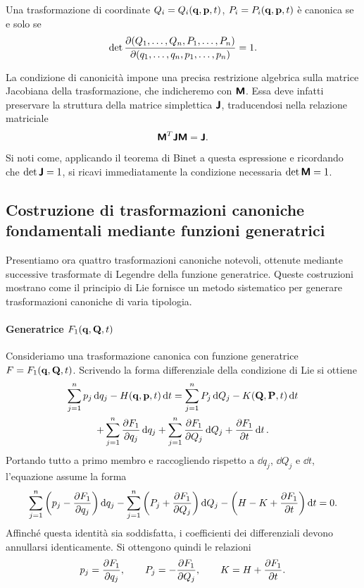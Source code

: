 \begin{proposition}
    Una trasformazione di coordinate $Q_i = Q_i(\vb{q}, \vb{p}, t)$, $P_i = P_i(\vb{q}, \vb{p}, t)$ è canonica se e solo se
    \begin{equation*}
        \det \pdv{(Q_1, \dots, Q_n, P_1, \dots, P_n)}{(q_1, \dots, q_n, p_1, \dots, p_n)} = 1.
    \end{equation*}
\end{proposition}
\begin{remark}
    La condizione di canonicità impone una precisa restrizione algebrica sulla matrice Jacobiana della trasformazione, che indicheremo con $\boldsymbol{\mathsf{M}}$. Essa deve infatti preservare la struttura della matrice simplettica $\boldsymbol{\mathsf{J}}$, traducendosi nella relazione matriciale
    \begin{equation*}        
        \boldsymbol{\mathsf{M}}^T \boldsymbol{\mathsf{J}} \boldsymbol{\mathsf{M}} = \boldsymbol{\mathsf{J}}.
    \end{equation*}
    Si noti come, applicando il teorema di Binet a questa espressione e ricordando che $\det\boldsymbol{\mathsf{J}} = 1$, si ricavi immediatamente la condizione necessaria $\det\boldsymbol{\mathsf{M}} = 1$.
\end{remark}

\subsection{Costruzione di trasformazioni canoniche fondamentali mediante funzioni generatrici}

Presentiamo ora quattro trasformazioni canoniche notevoli, ottenute mediante successive trasformate di Legendre della funzione generatrice. Queste costruzioni mostrano come il principio di Lie fornisce un metodo sistematico per generare trasformazioni canoniche di varia tipologia.

\paragraph{Generatrice $F_1(\vb{q}, \vb{Q}, t)$}
Consideriamo una trasformazione canonica con funzione generatrice $F=F_1(\vb{q}, \vb{Q}, t)$. Scrivendo la forma differenziale della condizione di Lie si ottiene
\begin{multline*}
    \sum_{j=1}^n p_j \dd{q_j} - H(\vb{q}, \vb{p}, t) \dd{t} = \sum_{j=1}^n P_j \dd{Q_j} - K(\vb{Q}, \vb{P}, t) \dd{t} \\
    + \sum_{j=1}^n \pdv{F_1}{q_j} \dd{q_j} + \sum_{j=1}^n \pdv{F_1}{Q_j} \dd{Q_j} + \pdv{F_1}{t} \dd{t}.
\end{multline*}
Portando tutto a primo membro e raccogliendo rispetto a $\dd{q_j}$, $\dd{Q_j}$ e $\dd{t}$, l'equazione assume la forma
\begin{equation*}
    \sum_{j=1}^n \left(p_j - \pdv{F_1}{q_j}\right) \dd{q_j} - \sum_{j=1}^n \left(P_j + \pdv{F_1}{Q_j}\right) \dd{Q_j} - \left(H - K + \pdv{F_1}{t}\right) \dd{t} = 0.
\end{equation*}
Affinché questa identità sia soddisfatta, i coefficienti dei differenziali devono annullarsi identicamente. Si ottengono quindi le relazioni
\begin{equation*}
    p_j = \pdv{F_1}{q_j}, \qquad
    P_j = - \pdv{F_1}{Q_j}, \qquad
    K = H + \pdv{F_1}{t}.
\end{equation*}

